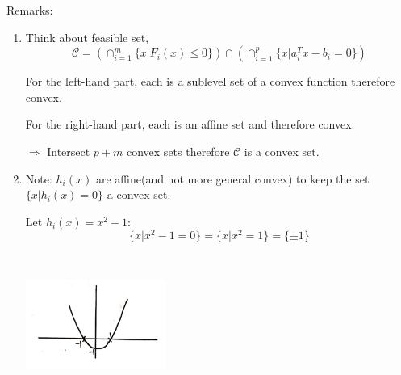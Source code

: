 %	

Remarks:

\begin{enumerate}
	\item Think about feasible set,
	\begin{equation*}
	\mathcal{C} = (\cap^m_{i=1}\{x\vert F_i(x) \leq 0 \})\cap(\cap^p_{i=1}\{x\vert a_i^Tx - b_i = 0 \})
	\end{equation*}
	
	For the left-hand part, each is a sublevel set of a convex function therefore convex.
	
	For the right-hand part, each is an affine set and therefore convex.
	
	$\Rightarrow$ Intersect $p+m$ convex sets therefore $\mathcal{C}$ is a convex set.
	
	\item Note: $h_i(x)$ are affine(and not more general convex) to keep the set $\{x\vert h_i(x) = 0 \}$ a convex set. 
	
	Let $h_i(x) = x^2 - 1$: 
	\begin{equation*}
	\{x\vert x^2 - 1 = 0 \} = \{x\vert x^2 = 1 \} = \{\pm 1 \}
	\end{equation*}
	\begin{marginfigure}
	\centering
	\includegraphics[width=1.8in,height=1.8in]{figures/ch08/figure1111_6.png}
	\end{marginfigure}
\end{enumerate}

